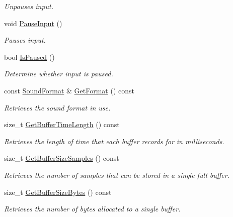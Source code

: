 \begin{DoxyCompactItemize}
\begin{DoxyCompactList}\small\item\em Unpauses input. \item\end{DoxyCompactList}\item 
void \hyperlink{class_sound_instance_input_a0ef43dc02cff3fd817bc80130ecd858f}{PauseInput} ()
\begin{DoxyCompactList}\small\item\em Pauses input. \item\end{DoxyCompactList}\item 
bool \hyperlink{class_sound_instance_input_aaf3a176a4e3dce0dd712db929eeddce6}{IsPaused} ()
\begin{DoxyCompactList}\small\item\em Determine whether input is paused. \item\end{DoxyCompactList}\item 
const \hyperlink{class_sound_format}{SoundFormat} \& \hyperlink{class_sound_instance_input_afde14be7892beff1e99eadebbfc07156}{GetFormat} () const 
\begin{DoxyCompactList}\small\item\em Retrieves the sound format in use. \item\end{DoxyCompactList}\item 
size\_\-t \hyperlink{class_sound_instance_input_ada348e92cccafa0712400787f4d494d5}{GetBufferTimeLength} () const 
\begin{DoxyCompactList}\small\item\em Retrieves the length of time that each buffer records for in milliseconds. \item\end{DoxyCompactList}\item 
size\_\-t \hyperlink{class_sound_instance_input_a69f991f3dd98769e961f73e4d7a9b212}{GetBufferSizeSamples} () const 
\begin{DoxyCompactList}\small\item\em Retrieves the number of samples that can be stored in a single full buffer. \item\end{DoxyCompactList}\item 
size\_\-t \hyperlink{class_sound_instance_input_af6907fbfe5d0c614b9da58bad7f2504f}{GetBufferSizeBytes} () const 
\begin{DoxyCompactList}\small\item\em Retrieves the number of bytes allocated to a single buffer. \item\end{DoxyCompactList}\item 

\end{DoxyCompactItemize}

